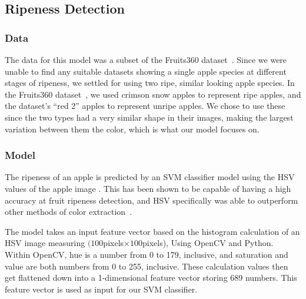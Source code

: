 \subsection{Ripeness Detection}
\subsubsection{Data}
The data for this model was a subset of the Fruits360 dataset~\cite{Fruit360}.
Since we were unable to find any suitable datasets showing a single apple species at different stages of ripeness, we settled for using two ripe, similar looking apple species.
In the Fruits360 dataset~\cite{Fruit360}, we used crimson snow apples to represent ripe apples, and the dataset's ``red 2'' apples to represent unripe apples. We  chose to use these since the two types had a very similar shape in their images, making the largest variation between them the color, which is what our model focuses on.

\subsubsection{Model}
The ripeness of an apple is predicted by an SVM classifier model using the HSV values of the apple image . This has been shown to be capable of having a high accuracy at fruit ripeness detection, and HSV specifically was able to outperform other methods of color extraction~\cite{HSVRipeness}.

The model takes an input feature vector based on the histogram calculation of an HSV image measuring $(100$pixels$\times100$pixels), Using OpenCV and Python.
Within OpenCV, hue is a number from 0 to 179, inclusive, and saturation and value are both numbers from 0 to 255, inclusive.
These calculation values then get flattened down into a 1-dimensional feature vector storing 689 numbers. 
This feature vector is used as input for our SVM classifier.

